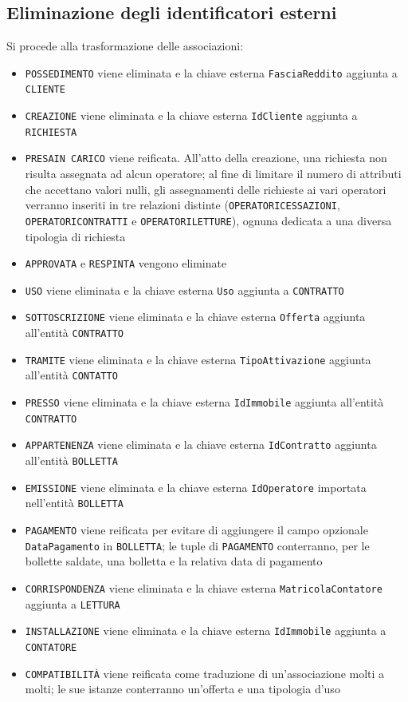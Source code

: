 \documentclass[a4paper,12pt]{report}
\begin{document}
\subsection{Eliminazione degli identificatori esterni}
Si procede alla trasformazione delle associazioni:
\begin{itemize}
    \item \texttt{POSSEDIMENTO} viene eliminata e la chiave esterna \texttt{FasciaReddito} aggiunta a \texttt{CLIENTE}
    \item \texttt{CREAZIONE} viene eliminata e la chiave esterna \texttt{IdCliente} aggiunta a \texttt{RICHIESTA}
    \item \texttt{PRESA\textunderscore IN \textunderscore CARICO} viene reificata. All'atto della creazione, una richiesta non risulta assegnata ad alcun operatore; al fine di limitare il numero di attributi che accettano valori nulli, gli assegnamenti delle richieste ai vari operatori verranno inseriti in tre relazioni distinte (\texttt{OPERATORI\textunderscore CESSAZIONI}, \texttt{OPERATORI\textunderscore CONTRATTI} e \texttt{OPERATORI\textunderscore LETTURE}), ognuna dedicata a una diversa tipologia di richiesta
    \item \texttt{APPROVATA} e \texttt{RESPINTA} vengono eliminate
    \item \texttt{USO} viene eliminata e la chiave esterna \texttt{Uso} aggiunta a \texttt{CONTRATTO}
    \item \texttt{SOTTOSCRIZIONE} viene eliminata e la chiave esterna \texttt{Offerta} aggiunta all'entità \texttt{CONTRATTO}
    \item \texttt{TRAMITE} viene eliminata e la chiave esterna \texttt{TipoAttivazione} aggiunta all'entità \texttt{CONTATTO}
    \item \texttt{PRESSO} viene eliminata e la chiave esterna \texttt{IdImmobile} aggiunta all'entità \texttt{CONTRATTO}
    \item \texttt{APPARTENENZA} viene eliminata e la chiave esterna \texttt{IdContratto} aggiunta all'entità \texttt{BOLLETTA}
    \item \texttt{EMISSIONE} viene eliminata e la chiave esterna \texttt{IdOperatore} importata nell'entità \texttt{BOLLETTA}
    \item \texttt{PAGAMENTO} viene reificata per evitare di aggiungere il campo opzionale \texttt{DataPagamento} in \texttt{BOLLETTA}; le tuple di \texttt{PAGAMENTO} conterranno, per le bollette saldate, una bolletta e la relativa data di pagamento
    \item \texttt{CORRISPONDENZA} viene eliminata e la chiave esterna \texttt{MatricolaContatore} aggiunta a \texttt{LETTURA}
    \item \texttt{INSTALLAZIONE} viene eliminata e la chiave esterna \texttt{IdImmobile} aggiunta a \texttt{CONTATORE}
    \item \texttt{COMPATIBILITÀ} viene reificata come traduzione di un'associazione molti a molti; le sue istanze conterranno un'offerta e una tipologia d'uso
\end{itemize}
\end{document}
